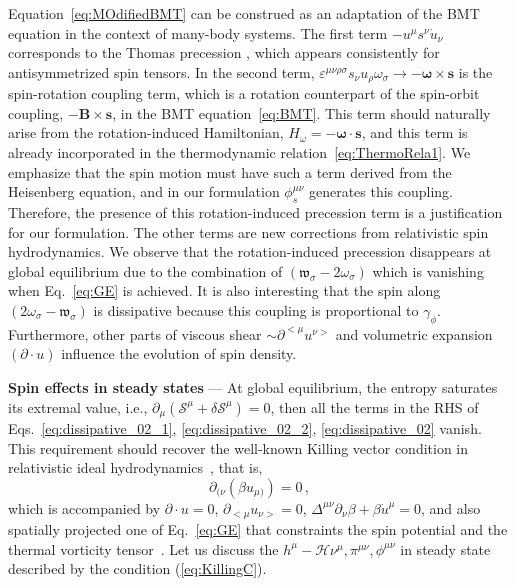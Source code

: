 \documentclass[prl,superscriptaddress,twocolumn,
  showpacs,preprintnumbers,amsmath,amssymb]{revtex4-1}
\newcommand{\vOmega}{\mathfrak{w}}
\begin{document}
Equation~\eqref{eq:MOdifiedBMT} can be construed as an adaptation of the BMT equation in the context
of many-body systems. The first term $-u^\mu s^\nu \dot{u}_\nu$ corresponds to the Thomas precession \cite{Weinberg:1972kfs}, which appears consistently for antisymmetrized spin tensors.  In the second term, $\varepsilon^{\mu\nu\rho\sigma}s_\nu u_\rho \omega_\sigma \rightarrow - {\bm \omega} \times {\bm s}$ is the spin-rotation coupling term, which is a rotation counterpart of the spin-orbit coupling, $-{\bm B}\times {\bm s}$, in the BMT equation~\eqref{eq:BMT}.  This term should naturally arise from the rotation-induced Hamiltonian, $H_\omega = - {\bm \omega} \cdot {\bm s}$, and this term is already incorporated in the thermodynamic relation~\eqref{eq:ThermoRela1}.  We emphasize that the spin motion must have such a term derived from the Heisenberg equation, and in our formulation $\phi_s^{\mu\nu}$ generates this coupling.  Therefore, the presence of this rotation-induced precession term is a justification for our formulation.
The other terms are new corrections from relativistic spin hydrodynamics.  We observe that the rotation-induced precession disappears at global equilibrium due to the combination of $(\vOmega_\sigma - 2\omega_\sigma)$ which is vanishing when Eq.~\eqref{eq:GE} is achieved.  It is also interesting that the spin along $(2\omega_\sigma - \vOmega_\sigma)$ is dissipative because this coupling is proportional to $\gamma_\phi$.
Furthermore, other parts of viscous shear $\sim \partial^{<\mu} u^{\nu>}$ and volumetric expansion $(\partial \cdot u)$ influence the evolution of spin density.
\vspace{0.5em}



\noindent
\textbf{Spin effects in steady states}
---
At global equilibrium, the entropy saturates its extremal value, i.e., $\partial_\mu(\mathcal{S}^\mu + \delta \mathcal{S}^\mu)=0$, then all the terms in the RHS of Eqs.~\eqref{eq:dissipative_02_1}, \eqref{eq:dissipative_02_2}, \eqref{eq:dissipative_02} vanish.  This requirement should recover the well-known Killing vector condition in relativistic ideal hydrodynamics~\cite{Gao:2012ix}, that is,
\begin{equation}
    \partial_{(\nu}(\beta u_{\mu)})=0 \,,
    \label{eq:KillingC}
\end{equation}
which is accompanied by $\partial\cdot u=0$, $\partial_{<\mu}u_{\nu>}=0$, $\Delta^{\mu\nu}\partial_{\nu}\beta + \beta \dot{u}^\mu=0$, and also spatially projected one of Eq.~\eqref{eq:GE} that constraints the spin potential and the thermal
vorticity tensor~\cite{Becattini:2012tc}.
Let us discuss the $h^\mu -\mathcal{H} \nu^\mu, \pi^{\mu\nu}, \phi^{\mu\nu}$ in steady state described by the condition (\ref{eq:KillingC}).
\end{document}
